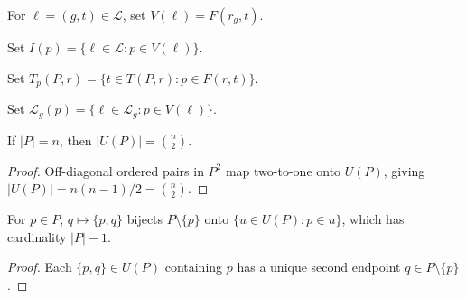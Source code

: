 \begin{definition}
    \label{def:compression_distributed_link_parties}
    \leanok
    For $\ell=(g,t)\in\mathcal L$, set $V(\ell)=F(r_g,t)$.
\end{definition}

\begin{definition}
    \label{def:compression_distributed_incidence}
    \leanok
    Set $I(p)=\{\ell\in\mathcal L:p\in V(\ell)\}$.
\end{definition}

\begin{definition}
    \label{def:compression_gate_label_incidence}
    \leanok
    Set $T_p(P,r)=\{t\in T(P,r):p\in F(r,t)\}$.
\end{definition}

\begin{definition}
    \label{def:compression_gate_incidence}
    \leanok
    Set $\mathcal L_g(p)=\{\ell\in\mathcal L_g:p\in V(\ell)\}$.
\end{definition}

\begin{lemma}
    \label{thm:compression_pair_label_count}
    \leanok
    If $|P|=n$, then $|U(P)|=\binom n2$.
\end{lemma}

\begin{proof}\leanok
    Off-diagonal ordered pairs in $P^2$ map two-to-one onto $U(P)$, giving $|U(P)|=n(n-1)/2=\binom n2$.
\end{proof}

\begin{lemma}
    \label{thm:compression_pair_incidence}
    \leanok
    For $p\in P$, $q\mapsto\{p,q\}$ bijects $P\setminus\{p\}$ onto $\{u\in U(P):p\in u\}$, which has cardinality $|P|-1$.
\end{lemma}

\begin{proof}\leanok
    Each $\{p,q\}\in U(P)$ containing $p$ has a unique second endpoint $q\in P\setminus\{p\}$.
\end{proof}

